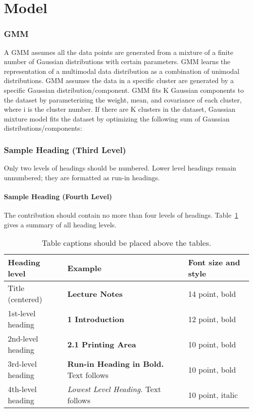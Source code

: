 \documentclass[runningheads]{llncs}
\begin{document}
\section{Model}
\subsubsection{GMM}
A GMM assumes all the data points are generated from a mixture of a finite number of Gaussian 
distributions with certain parameters. GMM learns the representation of a multimodal data 
distribution as a combination of unimodal distributions. GMM assumes the data in a specific 
cluster are generated by a specific Gaussian distribution/component. GMM fits K Gaussian components 
to the dataset by parameterizing the weight, mean, and covariance of each cluster, where i is the 
cluster number. If there are K clusters in the dataset, Gaussian mixture model fits the dataset by 
optimizing the following sum of Gaussian distributions/components:

\subsubsection{Sample Heading (Third Level)} Only two levels of
headings should be numbered. Lower level headings remain unnumbered;
they are formatted as run-in headings.

\paragraph{Sample Heading (Fourth Level)}
The contribution should contain no more than four levels of
headings. Table~\ref{tab1} gives a summary of all heading levels.

\begin{table}
\caption{Table captions should be placed above the
tables.}\label{tab1}
\begin{tabular}{|l|l|l|}
\hline
Heading level &  Example & Font size and style\\
\hline
Title (centered) &  {\Large\bfseries Lecture Notes} & 14 point, bold\\
1st-level heading &  {\large\bfseries 1 Introduction} & 12 point, bold\\
2nd-level heading & {\bfseries 2.1 Printing Area} & 10 point, bold\\
3rd-level heading & {\bfseries Run-in Heading in Bold.} Text follows & 10 point, bold\\
4th-level heading & {\itshape Lowest Level Heading.} Text follows & 10 point, italic\\
\hline
\end{tabular}
\end{table}
\end{document}
